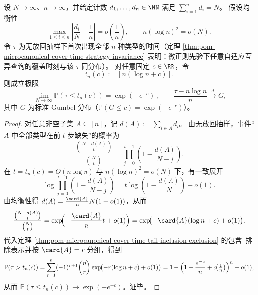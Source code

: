 \begin{theorem}\label{thm:pom-microcanonical-cover-time-gumbel-cutoff}
设 \(N\to\infty\)、\(n\to\infty\)，并给定计数 \(d_1,\dots,d_n\in\NN\) 满足 \(\sum_{i=1}^n d_i=N\)。
假设均衡性
\[
\max_{1\le i\le n}\left|\frac{d_i}{N}-\frac{1}{n}\right|=o\!\left(\frac{1}{n}\right),
\qquad
n(\log n)^2=o(N).
\]
令 \(\tau\) 为无放回抽样下首次出现全部 \(n\) 种类型的时间（定理 \ref{thm:pom-microcanonical-cover-time-strategy-invariance} 表明：微正则先验下任意自适应互异查询的覆盖时刻与该 \(\tau\) 同分布）。
对任意固定 \(c\in\RR\)，令
\[
t_n(c):=\left\lfloor n(\log n+c)\right\rfloor.
\]
则成立极限
\[
\boxed{\;
\lim_{N\to\infty}\mathbb{P}(\tau\le t_n(c))=\exp(-e^{-c})\;},
\qquad
\frac{\tau-n\log n}{n}\xrightarrow{d}G,
\]
其中 \(G\) 为标准 Gumbel 分布（\(\mathbb{P}(G\le c)=\exp(-e^{-c})\)）。
\end{theorem}
\begin{proof}
对任意非空子集 \(A\subseteq[n]\)，记 \(d(A):=\sum_{i\in A}d_i\)。
由无放回抽样，事件“\(A\) 中全部类型在前 \(t\) 步缺失”的概率为
\[
\frac{\binom{N-d(A)}{t}}{\binom{N}{t}}
=\prod_{j=0}^{t-1}\left(1-\frac{d(A)}{N-j}\right).
\]
在 \(t=t_n(c)=O(n\log n)\) 与 \(n(\log n)^2=o(N)\) 下，有一致展开
\[
\log\prod_{j=0}^{t-1}\left(1-\frac{d(A)}{N-j}\right)
=t\log\!\left(1-\frac{d(A)}{N}\right)+o(1).
\]
由均衡性得 \(d(A)=\frac{\card{A}}{n}N(1+o(1))\)，从而
\[
\frac{\binom{N-d(A)}{t}}{\binom{N}{t}}
=\exp\!\Bigl(-\frac{\card{A}}{n}t+o(1)\Bigr)
=\exp\!\bigl(-\card{A}(\log n+c)+o(1)\bigr).
\]
代入定理 \ref{thm:pom-microcanonical-cover-time-tail-inclusion-exclusion} 的包含--排除表示并按 \(\card{A}=r\) 分组，得到
\[
\mathbb{P}(\tau>t_n(c))
=\sum_{r=1}^n(-1)^{r+1}\binom{n}{r}\exp\!\bigl(-r(\log n+c)+o(1)\bigr)
=1-\Bigl(1-\frac{e^{-c}}{n}+o\!\bigl(\tfrac1n\bigr)\Bigr)^n+o(1),
\]
从而 \(\mathbb{P}(\tau\le t_n(c))\to \exp(-e^{-c})\)。证毕。
\end{proof}

